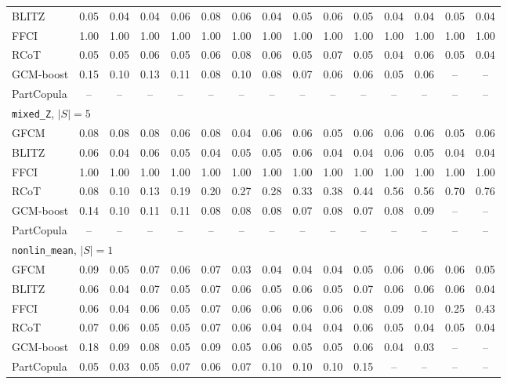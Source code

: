 \begin{longtable}{l*{14}{c}}
BLITZ & 0.05 & 0.04 & 0.04 & 0.06 & 0.08 & 0.06 & 0.04 & 0.05 & 0.06 & 0.05 & 0.04 & 0.04 & 0.05 & 0.04 \\
FFCI & 1.00 & 1.00 & 1.00 & 1.00 & 1.00 & 1.00 & 1.00 & 1.00 & 1.00 & 1.00 & 1.00 & 1.00 & 1.00 & 1.00 \\
RCoT & 0.05 & 0.05 & 0.06 & 0.05 & 0.06 & 0.08 & 0.06 & 0.05 & 0.07 & 0.05 & 0.04 & 0.06 & 0.05 & 0.04 \\
GCM-boost & 0.15 & 0.10 & 0.13 & 0.11 & 0.08 & 0.10 & 0.08 & 0.07 & 0.06 & 0.06 & 0.05 & 0.06 & -- & -- \\
PartCopula & -- & -- & -- & -- & -- & -- & -- & -- & -- & -- & -- & -- & -- & -- \\
\midrule \multicolumn{15}{l}{\texttt{mixed\_Z}, $|S|=5$}\\
GFCM & 0.08 & 0.08 & 0.08 & 0.06 & 0.08 & 0.04 & 0.06 & 0.06 & 0.05 & 0.06 & 0.06 & 0.06 & 0.05 & 0.06 \\
BLITZ & 0.06 & 0.04 & 0.06 & 0.05 & 0.04 & 0.05 & 0.05 & 0.06 & 0.04 & 0.04 & 0.06 & 0.05 & 0.04 & 0.04 \\
FFCI & 1.00 & 1.00 & 1.00 & 1.00 & 1.00 & 1.00 & 1.00 & 1.00 & 1.00 & 1.00 & 1.00 & 1.00 & 1.00 & 1.00 \\
RCoT & 0.08 & 0.10 & 0.13 & 0.19 & 0.20 & 0.27 & 0.28 & 0.33 & 0.38 & 0.44 & 0.56 & 0.56 & 0.70 & 0.76 \\
GCM-boost & 0.14 & 0.10 & 0.11 & 0.11 & 0.08 & 0.08 & 0.08 & 0.07 & 0.08 & 0.07 & 0.08 & 0.09 & -- & -- \\
PartCopula & -- & -- & -- & -- & -- & -- & -- & -- & -- & -- & -- & -- & -- & -- \\
\midrule \multicolumn{15}{l}{\texttt{nonlin\_mean}, $|S|=1$}\\
GFCM & 0.09 & 0.05 & 0.07 & 0.06 & 0.07 & 0.03 & 0.04 & 0.04 & 0.04 & 0.05 & 0.06 & 0.06 & 0.06 & 0.05 \\
BLITZ & 0.06 & 0.04 & 0.07 & 0.05 & 0.07 & 0.06 & 0.05 & 0.06 & 0.05 & 0.07 & 0.06 & 0.06 & 0.06 & 0.04 \\
FFCI & 0.06 & 0.04 & 0.06 & 0.05 & 0.07 & 0.06 & 0.06 & 0.06 & 0.06 & 0.08 & 0.09 & 0.10 & 0.25 & 0.43 \\
RCoT & 0.07 & 0.06 & 0.05 & 0.05 & 0.07 & 0.06 & 0.04 & 0.04 & 0.04 & 0.06 & 0.05 & 0.04 & 0.05 & 0.04 \\
GCM-boost & 0.18 & 0.09 & 0.08 & 0.05 & 0.09 & 0.05 & 0.06 & 0.05 & 0.05 & 0.06 & 0.04 & 0.03 & -- & -- \\
PartCopula & 0.05 & 0.03 & 0.05 & 0.07 & 0.06 & 0.07 & 0.10 & 0.10 & 0.10 & 0.15 & -- & -- & -- & -- \\

\end{longtable}
